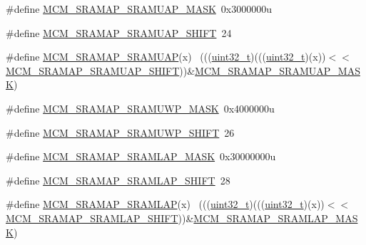 \begin{DoxyCompactItemize}
\item 
\#define \hyperlink{group___m_c_m___register___masks_gaea81ea6e952fefeccd24ea32ca2e1d19}{M\+C\+M\+\_\+\+S\+R\+A\+M\+A\+P\+\_\+\+S\+R\+A\+M\+U\+A\+P\+\_\+\+M\+A\+SK}~0x3000000u
\item 
\#define \hyperlink{group___m_c_m___register___masks_ga8eb0f229beebbb842a2f53eba9721800}{M\+C\+M\+\_\+\+S\+R\+A\+M\+A\+P\+\_\+\+S\+R\+A\+M\+U\+A\+P\+\_\+\+S\+H\+I\+FT}~24
\item 
\#define \hyperlink{group___m_c_m___register___masks_ga8a29d7e51903d09e2bc4aa96bc116ce7}{M\+C\+M\+\_\+\+S\+R\+A\+M\+A\+P\+\_\+\+S\+R\+A\+M\+U\+AP}(x)                                    ~(((\hyperlink{_p_e___types_8h_a33594304e786b158f3fb30289278f5af}{uint32\+\_\+t})(((\hyperlink{_p_e___types_8h_a33594304e786b158f3fb30289278f5af}{uint32\+\_\+t})(x))$<$$<$\hyperlink{group___m_c_m___register___masks_ga8eb0f229beebbb842a2f53eba9721800}{M\+C\+M\+\_\+\+S\+R\+A\+M\+A\+P\+\_\+\+S\+R\+A\+M\+U\+A\+P\+\_\+\+S\+H\+I\+FT}))\&\hyperlink{group___m_c_m___register___masks_gaea81ea6e952fefeccd24ea32ca2e1d19}{M\+C\+M\+\_\+\+S\+R\+A\+M\+A\+P\+\_\+\+S\+R\+A\+M\+U\+A\+P\+\_\+\+M\+A\+SK})
\item 
\#define \hyperlink{group___m_c_m___register___masks_ga51cc51d53d040b5210db11eb298ab8c2}{M\+C\+M\+\_\+\+S\+R\+A\+M\+A\+P\+\_\+\+S\+R\+A\+M\+U\+W\+P\+\_\+\+M\+A\+SK}~0x4000000u
\item 
\#define \hyperlink{group___m_c_m___register___masks_ga6c8ee7627c2a66ec379d94b9164deb41}{M\+C\+M\+\_\+\+S\+R\+A\+M\+A\+P\+\_\+\+S\+R\+A\+M\+U\+W\+P\+\_\+\+S\+H\+I\+FT}~26
\item 
\#define \hyperlink{group___m_c_m___register___masks_ga4a81bd3e9ed7116fb4c5b1278d57ee9f}{M\+C\+M\+\_\+\+S\+R\+A\+M\+A\+P\+\_\+\+S\+R\+A\+M\+L\+A\+P\+\_\+\+M\+A\+SK}~0x30000000u
\item 
\#define \hyperlink{group___m_c_m___register___masks_ga117a856a25e32983f5a0e2e7b561bbd9}{M\+C\+M\+\_\+\+S\+R\+A\+M\+A\+P\+\_\+\+S\+R\+A\+M\+L\+A\+P\+\_\+\+S\+H\+I\+FT}~28
\item 
\#define \hyperlink{group___m_c_m___register___masks_ga0473c826ce45deefc07f1e4520fded6f}{M\+C\+M\+\_\+\+S\+R\+A\+M\+A\+P\+\_\+\+S\+R\+A\+M\+L\+AP}(x)                                    ~(((\hyperlink{_p_e___types_8h_a33594304e786b158f3fb30289278f5af}{uint32\+\_\+t})(((\hyperlink{_p_e___types_8h_a33594304e786b158f3fb30289278f5af}{uint32\+\_\+t})(x))$<$$<$\hyperlink{group___m_c_m___register___masks_ga117a856a25e32983f5a0e2e7b561bbd9}{M\+C\+M\+\_\+\+S\+R\+A\+M\+A\+P\+\_\+\+S\+R\+A\+M\+L\+A\+P\+\_\+\+S\+H\+I\+FT}))\&\hyperlink{group___m_c_m___register___masks_ga4a81bd3e9ed7116fb4c5b1278d57ee9f}{M\+C\+M\+\_\+\+S\+R\+A\+M\+A\+P\+\_\+\+S\+R\+A\+M\+L\+A\+P\+\_\+\+M\+A\+SK})

\end{DoxyCompactItemize}
